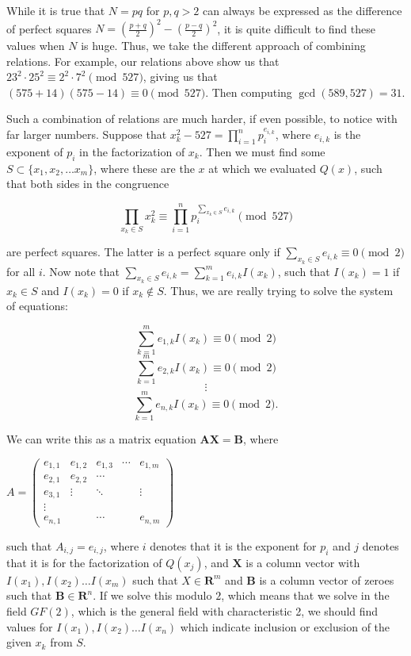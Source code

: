 \documentclass[11pt,twocolumn]{article}
\begin{document}
\indent While it is true that $N = pq$ for $p, q > 2$ can always be expressed as the difference of perfect squares $N = \left( \frac{p+q}{2} \right)^2 - \left( \frac{p-q}{2} \right)^2$, it is quite difficult to find these values when $N$ is huge. Thus, we take the different approach of combining relations. For example, our relations above show us that $23^2 \cdot 25^2 \equiv 2^2 \cdot 7^2 \pmod{527}$, giving us that $(575 + 14)(575 - 14) \equiv 0 \pmod{527}$. Then computing $\gcd(589, 527) = 31$.

\indent Such a combination of relations are much harder, if even possible, to notice with far larger numbers. Suppose that $x_k^2 - 527 = \displaystyle \prod_{i = 1}^n p_i^{e_{i, k}}$, where $e_{i, k}$ is the exponent of $p_i$ in the factorization of $x_k$. Then we must find some $S \subset \{x_1, x_2, \ldots x_m \}$, where these are the $x$ at which we evaluated $Q(x)$, such that both sides in the congruence

$$\displaystyle \prod_{x_k \in S} x_k^2 \equiv  \displaystyle \prod_{i = 1}^n p_i^{\displaystyle \sum_{x_k \in S} e_{i, k}} \pmod{527}$$

are perfect squares. The latter is a perfect square only if $\displaystyle \sum_{x_k \in S} e_{i, k} \equiv 0 \pmod{2}$ for all $i$. Now note that $\displaystyle \sum_{x_k \in S} e_{i, k} = \displaystyle \sum_{k = 1}^m e_{i, k} I(x_k)$, such that $I(x_k) = 1$ if $x_k \in S$ and $I(x_k) = 0$ if $x_k \not \in S$. Thus, we are really trying to solve the system of equations:

$$\displaystyle \sum_{k = 1}^m e_{1, k} I(x_k) \equiv 0 \pmod{2}$$
$$\displaystyle \sum_{k = 1}^m e_{2, k} I(x_k) \equiv 0 \pmod{2}$$
$$\vdots$$
$$\displaystyle \sum_{k = 1}^m e_{n, k} I(x_k) \equiv 0 \pmod{2}.$$

We can write this as a matrix equation $\mathbf{AX} = \mathbf{B}$, where

$A = \begin{pmatrix}
e_{1, 1} & e_{1, 2} & e_{1, 3} & \cdots & e_{1, m} \\
e_{2, 1} & e_{2, 2} & \cdots & & \\
e_{3, 1} & \vdots & \ddots & & \vdots\\
\vdots & & & & \\
e_{n, 1} & & \cdots & & e_{n, m}
\end{pmatrix}$

such that $A_{i, j} = e_{i, j}$, where $i$ denotes that it is the exponent for $p_i$ and $j$ denotes that it is for the factorization of $Q(x_j)$, and $\mathbf{X}$ is a column vector with $I(x_1), I(x_2) \ldots I(x_m)$ such that $X \in \mathbf{R}^m$ and $\mathbf{B}$ is a column vector of zeroes such that $\mathbf{B} \in \mathbf{R}^n$. If we solve this modulo $2$, which means that we solve in the field $GF(2)$, which is the general field with characteristic 2, we should find values for $I(x_1), I(x_2) \ldots I(x_n)$ which indicate inclusion or exclusion of the given $x_k$ from $S$.
\end{document}

